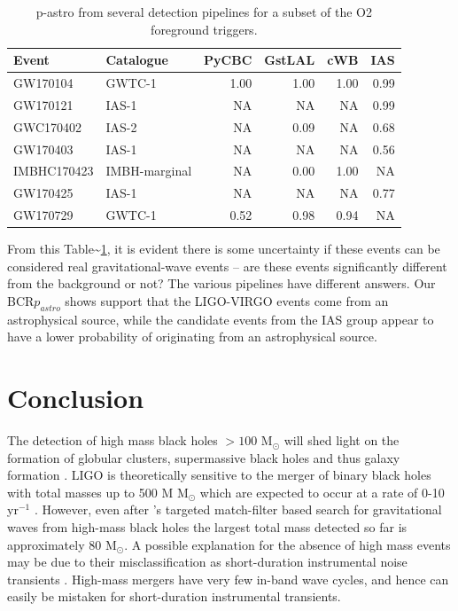 \documentclass[%
preprint,
 amsmath,amssymb,
 aps,
]{revtex4}
\newcommand{\bcr}{{\sc BCR}\xspace}
\newcommand{\msun}{{\sc M${}_\odot$}\xspace}
\begin{document}
\begin{table}[t]
\caption[p-astro for various O2 foreground triggers]{\label{tab:O2significancesWObcr}p-astro from several detection pipelines for a subset of the O2 foreground triggers.}
\centering
\begin{tabular}{llrrrr}
\toprule
Event & Catalogue & PyCBC & GstLAL & cWB & IAS\\
\midrule
GW170104 & GWTC-1 & 1.00 & 1.00 & 1.00 & 0.99\\
GW170121 & IAS-1 & NA & NA & NA & 0.99\\
GWC170402 & IAS-2 & NA & 0.09 & NA & 0.68\\
GW170403 & IAS-1 & NA & NA & NA & 0.56\\
IMBHC170423 & IMBH-marginal & NA & 0.00 & 1.00 & NA\\
GW170425 & IAS-1 & NA & NA & NA & 0.77\\
GW170729 & GWTC-1 & 0.52 & 0.98 & 0.94 & NA\\
\end{tabular}
\end{table}

From this Table\textasciitilde\ref{tab:O2significancesWObcr}, it is evident there is some uncertainty if these events can be considered real gravitational-wave events -- are these events significantly different from the background or not? The various pipelines have different answers. Our \bcr $p_{astro}$ shows support that the LIGO-VIRGO events come from an astrophysical source, while the candidate events from the IAS group appear to have a lower probability of originating from an astrophysical source.\\







\section{\label{sec:Conclusion}Conclusion}
The detection of high mass black holes $>100$ \msun will shed light on the formation of globular clusters, supermassive black holes and thus galaxy formation \citep{lodato2006supermassive, 2018IMBHreview}. LIGO is theoretically
sensitive to the merger of binary black holes with total masses up to 500 M \msun which are expected to occur at a rate of 0-10 yr\(^{-1}\) \cite{mandel2008rates, fregeau2006imbhbRatePrediction}. However, even after \citet{salemi2019search}'s targeted match-filter based search for gravitational waves from high-mass black holes the largest total mass detected so far is approximately 80 \msun \citep{abbott2019gwtc}. A possible explanation for the absence of high mass events may be due to their misclassification as short-duration instrumental noise transients \citep{blipGlitches}. High-mass mergers have very few in-band wave cycles, and hence can easily be mistaken for short-duration instrumental transients. \\
\end{document}
